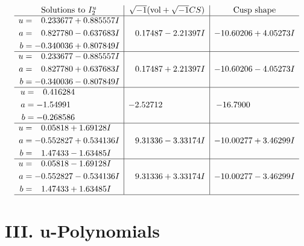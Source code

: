 \documentclass[1p]{elsarticle_modified}
\theoremstyle{definition}
\newcommand{\I}{\sqrt{-1}}
\begin{document}
$$\begin{array}{c|c|c}  
\text{Solutions to }I^u_{2}& \I (\text{vol} + \sqrt{-1}CS) & \text{Cusp shape}\\
 \hline 
\begin{aligned}
u &= \phantom{-}0.233677 + 0.885557 I \\
a &= \phantom{-}0.827780 - 0.637683 I \\
b &= -0.340036 + 0.807849 I\end{aligned}
 & \phantom{-}0.17487 - 2.21397 I & -10.60206 + 4.05273 I \\ \hline\begin{aligned}
u &= \phantom{-}0.233677 - 0.885557 I \\
a &= \phantom{-}0.827780 + 0.637683 I \\
b &= -0.340036 - 0.807849 I\end{aligned}
 & \phantom{-}0.17487 + 2.21397 I & -10.60206 - 4.05273 I \\ \hline\begin{aligned}
u &= \phantom{-}0.416284\phantom{ +0.000000I} \\
a &= -1.54991\phantom{ +0.000000I} \\
b &= -0.268586\phantom{ +0.000000I}\end{aligned}
 & -2.52712\phantom{ +0.000000I} & -16.7900\phantom{ +0.000000I} \\ \hline\begin{aligned}
u &= \phantom{-}0.05818 + 1.69128 I \\
a &= -0.552827 + 0.534136 I \\
b &= \phantom{-}1.47433 - 1.63485 I\end{aligned}
 & \phantom{-}9.31336 - 3.33174 I & -10.00277 + 3.46299 I \\ \hline\begin{aligned}
u &= \phantom{-}0.05818 - 1.69128 I \\
a &= -0.552827 - 0.534136 I \\
b &= \phantom{-}1.47433 + 1.63485 I\end{aligned}
 & \phantom{-}9.31336 + 3.33174 I & -10.00277 - 3.46299 I\\
 \hline 
 \end{array}$$\newpage
\newpage\renewcommand{\arraystretch}{1}
\centering \section*{ III. u-Polynomials}
\end{document}
